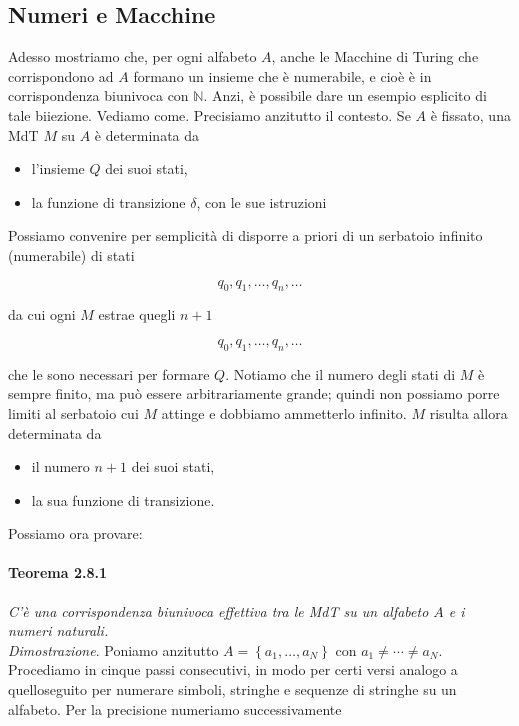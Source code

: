 \subsection{Numeri e Macchine}

Adesso mostriamo che, per ogni alfabeto $A$, anche le Macchine di Turing che
corrispondono ad $A$ formano un insieme che è numerabile, e cioè è in corrispondenza
biunivoca con $\mathbb{N}$. Anzi, è possibile dare un esempio esplicito di tale biiezione.
Vediamo come. Precisiamo anzitutto il contesto. Se $A$ è fissato, una MdT $M$ su $A$
è determinata da

\begin{itemize}
    \item l'insieme $Q$ dei suoi stati,
    \item la funzione di transizione $\delta$, con le
          sue istruzioni
\end{itemize}

Possiamo convenire per semplicità di disporre a priori di un serbatoio infinito
(numerabile) di stati

\[
    q_0, q_1, \ldots, q_n, \ldots
\]

da cui ogni $M$ estrae quegli $n+1$

\[
    q_0, q_1, \ldots, q_n, \ldots
\]

che le sono necessari per formare $Q$. Notiamo che il numero degli stati di $M$ è
sempre finito, ma può essere arbitrariamente grande; quindi non possiamo porre
limiti al serbatoio cui $M$ attinge e dobbiamo ammetterlo infinito. $M$ risulta allora
determinata da

\begin{itemize}
    \item il numero $n + 1$ dei suoi stati,
    \item la sua funzione di transizione.
\end{itemize}

Possiamo ora provare:

\paragraph{Teorema 2.8.1} \textit{C'è una corrispondenza biunivoca effettiva tra le MdT su un
    alfabeto $A$ e i numeri naturali.}\\

\textit{Dimostrazione}. Poniamo anzitutto $A=\left\{a_1, \ldots, a_N\right\}$ con
$a_1 \neq \cdots \neq a_N$. Procediamo in cinque passi consecutivi, in modo per certi
versi analogo a quelloseguito per numerare simboli, stringhe e sequenze di stringhe
su un alfabeto. Per la precisione numeriamo successivamente

